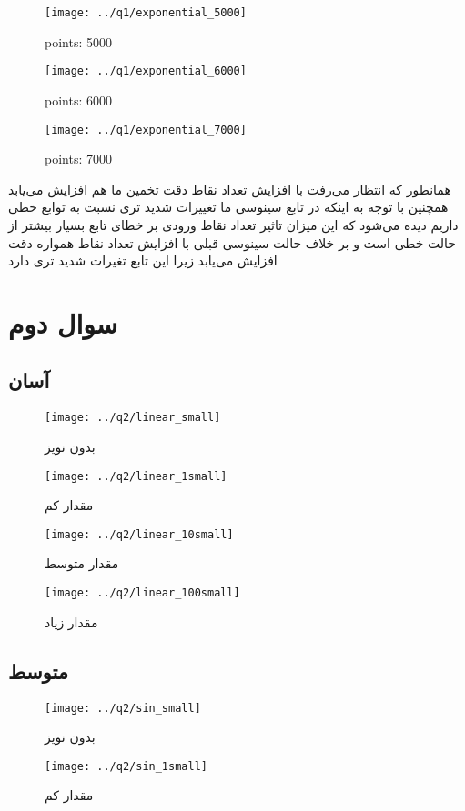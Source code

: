 \documentclass[a4paper,12pt]{article}
\begin{document}
\begin{figure}[!htb]
  \texttt{[image: ../q1/exponential\_5000]}
  \caption{points: 5000}
\endminipage\hfill
{}
  \texttt{[image: ../q1/exponential\_6000]}
  \caption{points: 6000}
\endminipage\hfill
{}
  \texttt{[image: ../q1/exponential\_7000]}
  \caption{points: 7000}
\endminipage
\end{figure}
همانطور که انتظار می‌رفت با افزایش تعداد نقاط دقت تخمین ما هم افزایش می‌یابد همچنین با توجه به اینکه در تابع سینوسی ما تغییرات شدید تری نسبت به توابع خطی داریم دیده می‌شود که این میزان تاثیر تعداد نقاط ورودی بر خطای تابع بسیار بیشتر از حالت خطی است و بر خلاف حالت سینوسی قبلی با افزایش تعداد نقاط همواره دقت افزایش می‌یابد زیرا این تابع تغیرات شدید تری دارد




\newpage
\section{سوال دوم}

\subsection{آسان}

\begin{figure}[!htb]
  \texttt{[image: ../q2/linear\_small]}
  \caption{بدون نویز}
\endminipage\hfill
{}
  \texttt{[image: ../q2/linear\_1small]}
  \caption{مقدار کم}
\endminipage\hfill
\end{figure}


\begin{figure}[!htb]
  \texttt{[image: ../q2/linear\_10small]}
  \caption{مقدار متوسط}
\endminipage\hfill
{}
  \texttt{[image: ../q2/linear\_100small]}
  \caption{مقدار زیاد}
\endminipage\hfill
\end{figure}
\newpage
\subsection{متوسط}

\begin{figure}[!htb]
  \texttt{[image: ../q2/sin\_small]}
  \caption{بدون نویز}
\endminipage\hfill
{}
  \texttt{[image: ../q2/sin\_1small]}
  \caption{مقدار کم}
\endminipage\hfill
\end{figure}
\end{document}
